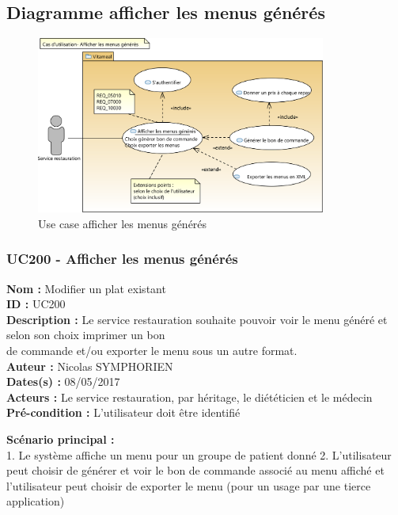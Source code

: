 \subsection{Diagramme afficher les menus
générés}\label{diagramme-afficher-les-menus-guxe9nuxe9ruxe9s}

\begin{figure}
\centering
\includegraphics[width=0.85\textwidth]{../../CasDUtilisations/AfficherMenu/uc_afficher_menu.png}
\caption{Use case afficher les menus générés}
\end{figure}

\subsubsection{UC200 - Afficher les menus
générés}\label{uc200---afficher-les-menus-guxe9nuxe9ruxe9s}

\noindent\textbf{Nom :} Modifier un plat existant\\
\textbf{ID :} UC200\\
\textbf{Description :} Le service restauration souhaite pouvoir voir le
menu généré et selon son choix imprimer un bon\\
de commande et/ou exporter le menu sous un autre format.\\
\textbf{Auteur :} Nicolas SYMPHORIEN\\
\textbf{Dates(s) :} 08/05/2017\\
\textbf{Acteurs :} Le service restauration, par héritage, le diététicien
et le médecin\\
\textbf{Pré-condition :} L'utilisateur doit être identifié

\textbf{Scénario principal :}\\
1. Le système affiche un menu pour un groupe de patient donné 2.
L'utilisateur peut choisir de générer et voir le bon de commande associé
au menu affiché et l'utilisateur peut choisir de exporter le menu (pour
un usage par une tierce application)

